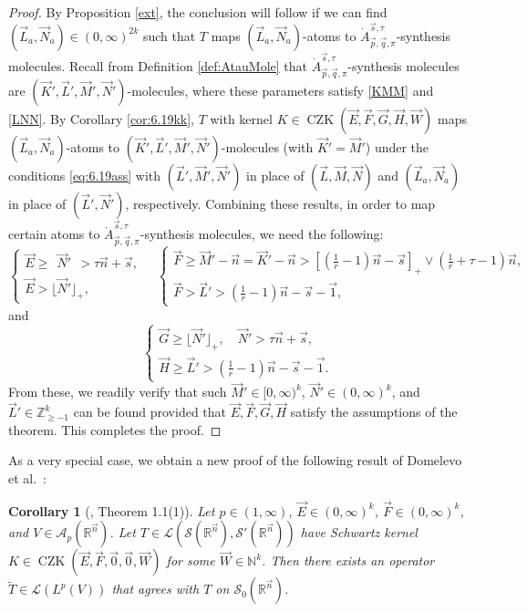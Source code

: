 \documentclass[11pt, reqno]{amsart}
\newtheorem{corollary}[theorem]{Corollary}
\theoremstyle{definition}
\theoremstyle{remark}
\numberwithin{equation}{section}
\newcommand{\vE}{\vec E}
\newcommand{\vF}{\vec F}
\newcommand{\N}{\mathbb N}
\newcommand{\R}{\mathbb R}
\newcommand{\Z}{\mathbb Z}
\newcommand{\vone}{\vec 1}
\newcommand{\vn}{\vec n}
\newcommand{\vp}{\vec p}
\newcommand{\vq}{\vec q}
\newcommand{\vs}{\vec s}
\newcommand{\Atau}{\dot A^{\vs,\tau}_{\vp,\vq,\pi}}
\newcommand{\floor}[1]{\lfloor #1 \rfloor}
\begin{document}
\begin{proof}
By Proposition \ref{ext}, the conclusion will follow if we can find
$(\vec L_a,\vec N_a)\in(0,\infty)^{2k}$ such that $T$ maps $(\vec L_a, \vec N_a)$-atoms
to $\Atau$-synthesis molecules. Recall from Definition \ref{def:AtauMole} that $\Atau$-synthesis molecules are $(\vec K',\vec L',\vec M',\vec N')$-molecules, where these parameters satisfy \eqref{KMM} and \eqref{LNN}. By Corollary \ref{cor:6.19kk},
$T$ with kernel $K\in\operatorname{CZK}(\vE,\vF,\vec G,\vec H,\vec W)$
maps $(\vec L_a,\vec N_a)$-atoms to $(\vec K',\vec L',\vec M',\vec N')$-molecules
(with $\vec K'=\vec M'$) under the conditions \eqref{eq:6.19ass}
with $(\vec L',\vec M',\vec N')$ in place of $(\vec L,\vec M,\vec N)$
and $(\vec L_a,\vec N_a)$ in place of $(\vec L',\vec N')$, respectively.
Combining these results, in order to map certain atoms
to $\Atau$-synthesis molecules, we need the following:
\begin{equation*}
\begin{cases}\vE\geq \phantom{\lfloor}\vec N'\phantom{\rfloor}>\tau\vn+\vs, \\ \vE>\floor{\vec N'}_+,\end{cases}\quad
\begin{cases}\vF\geq \vec M'-\vn=\vec K'-\vn>[(\frac1r-1)\vn-\vs]_+\vee(\frac1r+\tau-1)\vn, \\
\vF>\vec L'>(\frac1r-1)\vn-\vec s-\vone,\end{cases}
\end{equation*}
and
\begin{equation*}
  \begin{cases}\vec G\geq \floor{\vec N'}_+, \quad \vec N'>\tau\vn+\vs, \\
  \vec H\geq\vec L'>(\frac1r-1)\vn-\vs-\vone.\end{cases}
\end{equation*}
From these, we readily verify that such $\vec M'\in[0,\infty)^k$, $\vec N'\in(0,\infty)^k$, and $\vec L'\in\Z_{\geq-1}^k$ can be found provided that $\vE,\vF,\vec G,\vec H$ satisfy the assumptions of the theorem. This completes the proof.
\end{proof}

As a very special case, we obtain a new proof of the following result of Domelevo et al.\ \cite{DKPS}:

\begin{corollary}[\cite{DKPS}, Theorem 1.1(1)]\label{T1Co}
Let $p\in(1,\infty)$, $\vec E\in(0,\infty)^k$, $\vec F\in(0,\infty)^k$, and $V\in\mathscr A_p(\R^{\vn})$.
Let $T\in\mathcal L(\mathscr S(\R^{\vn}),\mathscr S'(\R^{\vn}))$ have Schwartz kernel
$K\in\operatorname{CZK}(\vE,\vF,\vec 0,\vec 0,\vec W)$ for some $\vec W\in\N^k$.
Then there exists an operator $\widetilde T\in\mathcal L(L^p(V))$
that agrees with $T$ on $\mathscr{S}_0(\mathbb R^{\vn})$.
\end{corollary}
\end{document}
